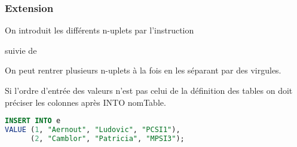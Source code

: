 \subsubsection{Extension}
On introduit les différents n-uplets par l'instruction 

suivie de 

\medskip

On peut rentrer plusieurs n-uplets à la fois en les séparant par des virgules.

Si l'ordre d'entrée des valeurs n'est pas celui de la définition des tables on doit préciser les colonnes après INTO nomTable.

\begin{lstlisting}[language=SQL]
INSERT INTO e 
VALUE (1, "Aernout", "Ludovic", "PCSI1"),
      (2, "Camblor", "Patricia", "MPSI3");
\end{lstlisting}




